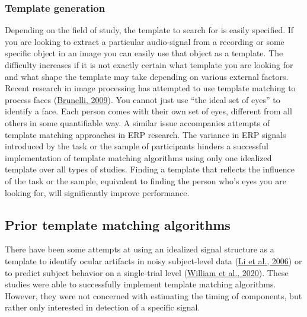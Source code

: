 \documentclass[
  man]{apa7}
\begin{document}
\hypertarget{template-generation}{%
\subsubsection{Template generation}\label{template-generation}}

Depending on the field of study, the template to search for is easily specified. If you are looking to extract a particular audio-signal from a recording or some specific object in an image you can easily use that object as a template. The difficulty increases if it is not exactly certain what template you are looking for and what shape the template may take depending on various external factors. Recent research in image processing has attempted to use template matching to process faces (\protect\hyperlink{ref-brunelli2009template}{Brunelli, 2009}). You cannot just use ``the ideal set of eyes'' to identify a face. Each person comes with their own set of eyes, different from all others in some quantifiable way. A similar issue accompanies attempts of template matching approaches in ERP research. The variance in ERP signals introduced by the task or the sample of participants hinders a successful implementation of template matching algorithms using only one idealized template over all types of studies. Finding a template that reflects the influence of the task or the sample, equivalent to finding the person who's eyes you are looking for, will significantly improve performance.

\hypertarget{prior-template-matching-algorithms}{%
\subsection{Prior template matching algorithms}\label{prior-template-matching-algorithms}}

There have been some attempts at using an idealized signal structure as a template to identify ocular artifacts in noisy subject-level data (\protect\hyperlink{ref-li2006automatic}{Li et al., 2006}) or to predict subject behavior on a single-trial level (\protect\hyperlink{ref-william2020erp}{William et al., 2020}). These studies were able to successfully implement template matching algorithms. However, they were not concerned with estimating the timing of components, but rather only interested in detection of a specific signal.
\end{document}
